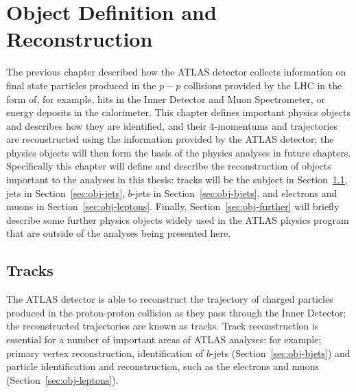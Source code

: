 \chapter{Object Definition and Reconstruction}
\label{sec:obj}

The previous chapter described how the ATLAS detector collects information on 
final state particles produced in the $p-p$ collisions provided by the LHC in the form of,
for example, hits in the Inner Detector and Muon Spectrometer,
or energy deposits in the calorimeter.
This chapter defines important physics objects
and describes how they are identified, and their 4-momentums and trajectories are reconstructed using the information provided by the ATLAS detector;
the physics objects will then form the basis of the physics analyses in future chapters.
Specifically this chapter will define and describe the reconstruction of objects important to the analyses in this thesis:
tracks will be the subject in Section~\ref{sec:obj-tracks}, jets in Section~\ref{sec:obj-jets},
$b$-jets in Section~\ref{sec:obj-bjets}, and electrons and muons in Section~\ref{sec:obj-leptons}.
Finally, Section~\ref{sec:obj-further} will briefly describe some further physics objects
widely used in the ATLAS physics program that are outside of the analyses being presented here.

\section{Tracks}
\label{sec:obj-tracks}

The ATLAS detector is able to reconstruct the trajectory of charged particles produced
in the proton-proton collision as they pass through the Inner Detector;
the reconstructed trajectories are known as tracks.
Track reconstruction is essential for a number of important areas of ATLAS analyses:
for example; primary vertex reconstruction, identification of $b$-jets (Section~\ref{sec:obj-bjets})
and particle identification and reconstruction, such as the electrons and muons (Section~\ref{sec:obj-leptons}).

